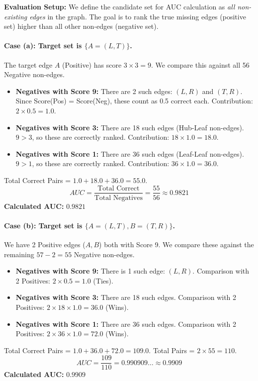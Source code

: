 \documentclass[11pt]{article}
\begin{document}
\noindent \textbf{Evaluation Setup:} We define the candidate set for AUC calculation as \textit{all non-existing edges} in the graph. The goal is to rank the true missing edges (positive set) higher than all other non-edges (negative set).

\paragraph{Case (a): Target set is $\{A = (L, T)\}$.}
The target edge $A$ (Positive) has score $3 \times 3 = 9$.
We compare this against all 56 Negative non-edges.
\begin{itemize}
    \item \textbf{Negatives with Score 9:} There are 2 such edges: $(L,R)$ and $(T,R)$. Since Score(Pos) = Score(Neg), these count as 0.5 correct each. Contribution: $2 \times 0.5 = 1.0$.
    \item \textbf{Negatives with Score 3:} There are 18 such edges (Hub-Leaf non-edges). $9 > 3$, so these are correctly ranked. Contribution: $18 \times 1.0 = 18.0$.
    \item \textbf{Negatives with Score 1:} There are 36 such edges (Leaf-Leaf non-edges). $9 > 1$, so these are correctly ranked. Contribution: $36 \times 1.0 = 36.0$.
\end{itemize}
Total Correct Pairs = $1.0 + 18.0 + 36.0 = 55.0$.
$$ AUC = \frac{\text{Total Correct}}{\text{Total Negatives}} = \frac{55}{56} \approx 0.9821 $$
\textbf{Calculated AUC:} $0.9821$

\paragraph{Case (b): Target set is $\{A = (L, T), B = (T, R)\}$.}
We have 2 Positive edges ($A, B$) both with Score 9.
We compare these against the remaining $57 - 2 = 55$ Negative non-edges.
\begin{itemize}
    \item \textbf{Negatives with Score 9:} There is 1 such edge: $(L,R)$.
    Comparison with 2 Positives: $2 \times 0.5 = 1.0$ (Ties).
    \item \textbf{Negatives with Score 3:} There are 18 such edges.
    Comparison with 2 Positives: $2 \times 18 \times 1.0 = 36.0$ (Wins).
    \item \textbf{Negatives with Score 1:} There are 36 such edges.
    Comparison with 2 Positives: $2 \times 36 \times 1.0 = 72.0$ (Wins).
\end{itemize}
Total Correct Pairs = $1.0 + 36.0 + 72.0 = 109.0$.
Total Pairs = $2 \times 55 = 110$.
$$ AUC = \frac{109}{110} = 0.990909\dots \approx 0.9909 $$
\textbf{Calculated AUC:} $0.9909$
\end{document}
